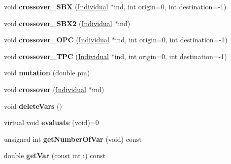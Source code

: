 \begin{DoxyCompactItemize}
\item 
\mbox{\label{classIndividual_a0972d982f28d6f51de7cf06ed35a2c1f}} 
void {\bfseries crossover\+\_\+\+S\+BX} (\mbox{\hyperlink{classIndividual}{Individual}} $\ast$ind, int origin=0, int destination=-\/1)
\item 
\mbox{\label{classIndividual_a44928e95dffa8255c21f70d7a906fdb0}} 
void {\bfseries crossover\+\_\+\+S\+B\+X2} (\mbox{\hyperlink{classIndividual}{Individual}} $\ast$ind)
\item 
\mbox{\label{classIndividual_a7349f4844f5a78a43e6e29d9e701887a}} 
void {\bfseries crossover\+\_\+\+O\+PC} (\mbox{\hyperlink{classIndividual}{Individual}} $\ast$ind, int origin=0, int destination=-\/1)
\item 
\mbox{\label{classIndividual_a43726fb38d841dd9fcb3e378c258ec06}} 
void {\bfseries crossover\+\_\+\+T\+PC} (\mbox{\hyperlink{classIndividual}{Individual}} $\ast$ind, int origin=0, int destination=-\/1)
\item 
\mbox{\label{classIndividual_a789500ea4f3299f1482b8ec7f38be9a3}} 
void {\bfseries mutation} (double pm)
\item 
\mbox{\label{classIndividual_a5c3c8a3b935c67bdb897410fc42c50c9}} 
void {\bfseries crossover} (\mbox{\hyperlink{classIndividual}{Individual}} $\ast$ind)
\item 
\mbox{\label{classIndividual_a909890a10fad8caedfee75df4e4275a4}} 
void {\bfseries delete\+Vars} ()
\item 
\mbox{\label{classIndividual_afe188906f7a4414c1420d81ba77cd19f}} 
virtual void {\bfseries evaluate} (void)=0
\item 
\mbox{\label{classIndividual_a567920f87071ab8bbac7bea9d9ef970f}} 
unsigned int {\bfseries get\+Number\+Of\+Var} (void) const
\item 
\mbox{\label{classIndividual_a1823a9a02df3bca64cca7b9d67ce39c3}} 
double {\bfseries get\+Var} (const int i) const
\item 

\end{DoxyCompactItemize}
